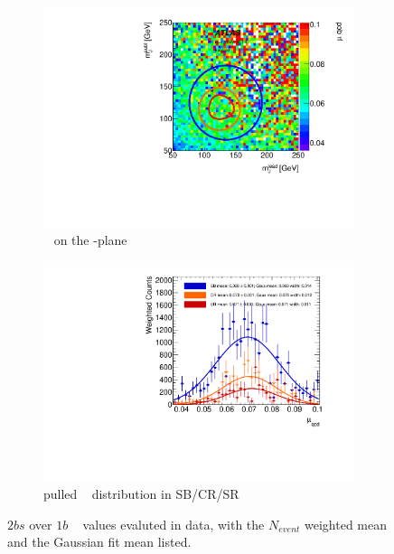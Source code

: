 \begin{figure}[htbp!]
\centering
\captionsetup{justification=centering}
	\hspace{-1cm}
    \begin{subfigure}[b]{0.4\textwidth}
        \includegraphics[width=\textwidth,angle=-90]{figures/boosted/AppendixMuqcdstudy/TwoTag_split_Incl_mH0H1.pdf}
        \caption{\muqcd~ on the \mleadJ-\msublJ plane}
        \label{fig:app-muqcd-2bs-2d}
    \end{subfigure}
    \quad \quad \quad \quad 
    \begin{subfigure}[b]{0.4\textwidth}
        \includegraphics[width=\textwidth,angle=-90]{figures/boosted/AppendixMuqcdstudy/TwoTag_split_Incl_mH0H1_pull.pdf}
        \caption{pulled \muqcd~ distribution in SB/CR/SR}
        \label{fig:app-muqcd-2bs-pull}
    \end{subfigure}
\caption{$2bs$ over $1b$ \muqcd~ values evaluted in data, with the $N_{event}$ weighted mean and the Gaussian fit mean listed.}
\label{fig:app-muqcd-2bs}
\end{figure}

